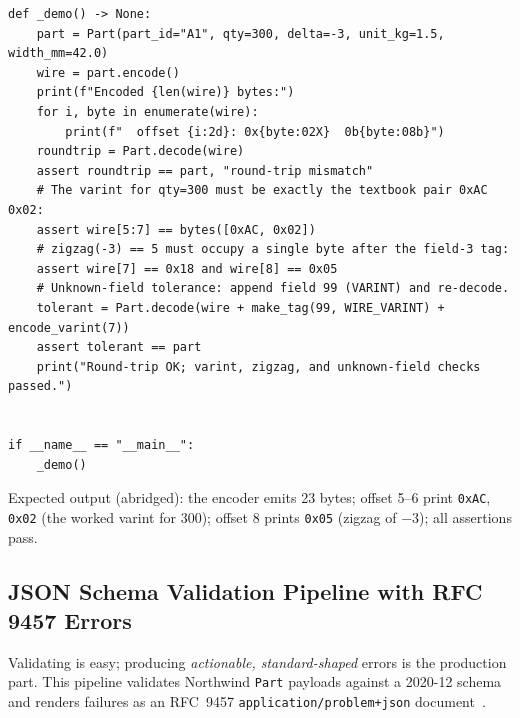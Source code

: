 \begin{verbatim}
def _demo() -> None:
    part = Part(part_id="A1", qty=300, delta=-3, unit_kg=1.5, width_mm=42.0)
    wire = part.encode()
    print(f"Encoded {len(wire)} bytes:")
    for i, byte in enumerate(wire):
        print(f"  offset {i:2d}: 0x{byte:02X}  0b{byte:08b}")
    roundtrip = Part.decode(wire)
    assert roundtrip == part, "round-trip mismatch"
    # The varint for qty=300 must be exactly the textbook pair 0xAC 0x02:
    assert wire[5:7] == bytes([0xAC, 0x02])
    # zigzag(-3) == 5 must occupy a single byte after the field-3 tag:
    assert wire[7] == 0x18 and wire[8] == 0x05
    # Unknown-field tolerance: append field 99 (VARINT) and re-decode.
    tolerant = Part.decode(wire + make_tag(99, WIRE_VARINT) + encode_varint(7))
    assert tolerant == part
    print("Round-trip OK; varint, zigzag, and unknown-field checks passed.")


if __name__ == "__main__":
    _demo()
\end{verbatim}

Expected output (abridged): the encoder emits 23 bytes; offset 5--6 print
\texttt{0xAC}, \texttt{0x02} (the worked varint for 300); offset 8 prints
\texttt{0x05} (zigzag of $-3$); all assertions pass.

\subsection{JSON Schema Validation Pipeline with RFC 9457 Errors}
\label{sec:ch4-code-schema}

Validating is easy; producing \emph{actionable, standard-shaped} errors is the
production part. This pipeline validates Northwind \texttt{Part} payloads against a
2020-12 schema and renders failures as an RFC~9457
\texttt{application/problem+json} document~\cite{rfc9457, jsonschemadocs}.


